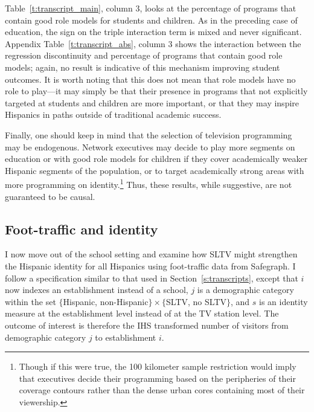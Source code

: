 \documentclass[11pt]{article}
\begin{document}
Table~\ref{t:transcript_main}, column 3, looks at the percentage of programs that contain good role models for students and children. As in the preceding case of education, the sign on the triple interaction term is mixed and never significant. Appendix Table~\ref{t:transcript_abs}, column 3 shows the interaction between the regression discontinuity and percentage of programs that contain good role models; again, no result is indicative of this mechanism improving student outcomes. It is worth noting that this does not mean that role models have no role to play---it may simply be that their presence in programs that not explicitly targeted at students and children are more important, or that they may inspire Hispanics in paths outside of traditional academic success.

Finally, one should keep in mind that the selection of television programming may be endogenous. Network executives may decide to play more segments on education or with good role models for children if they cover academically weaker Hispanic segments of the population, or to target academically strong areas with more programming on identity.\footnote{ Though if this were true, the 100 kilometer sample restriction would imply that executives decide their programming based on the peripheries of their coverage contours rather than the dense urban cores containing most of their viewership.} Thus, these results, while suggestive, are not guaranteed to be causal. 


\subsection{Foot-traffic and identity}\label{s:safegraph}

I now move out of the school setting and examine how SLTV might strengthen the Hispanic identity for all Hispanics using foot-traffic data from Safegraph. I follow a specification similar to that used in Section~\ref{s:transcripts}, except that $i$ now indexes an establishment instead of a school, $j$ is a demographic category within the set $\{$Hispanic, non-Hispanic$\} \times  \{$SLTV, no SLTV$\}$, and $s$ is an identity measure at the establishment level instead of at the TV station level. The outcome of interest is therefore the IHS transformed number of visitors from demographic category $j$ to establishment $i$.
\end{document}
